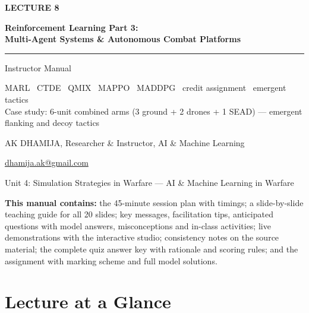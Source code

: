 \documentclass[11pt]{article}
\begin{document}
\begin{titlepage}\centering\vspace*{2.2cm}
{\color{AccN}\large\bfseries LECTURE 8\par}\vspace{0.6cm}
{\color{NavyN}\Huge\bfseries Reinforcement Learning Part 3:\\Multi-Agent Systems \& Autonomous Combat Platforms\par}\vspace{0.6cm}
{\color{AccN}\rule{0.7\textwidth}{1.5pt}}\par\vspace{0.6cm}
{\LARGE Instructor Manual\par}\vspace{0.4cm}
{\large\begin{minipage}{0.85\textwidth}\centering MARL \textbullet\ CTDE \textbullet\ QMIX \textbullet\ MAPPO \textbullet\ MADDPG \textbullet\ credit assignment \textbullet\ emergent tactics\\Case study: 6-unit combined arms (3 ground + 2 drones + 1 SEAD) --- emergent flanking and decoy tactics\end{minipage}\par}\vspace{2cm}
{\large AK DHAMIJA, Researcher \& Instructor, AI \& Machine Learning\par}\vspace{0.2cm}
{\normalsize \href{mailto:dhamija.ak@gmail.com}{dhamija.ak@gmail.com} \quad\textbullet{}\par}\vspace{0.3cm}
{Unit 4: Simulation Strategies in Warfare --- AI \& Machine Learning in Warfare\par}\vfill
\begin{tcolorbox}[colback=NavyN!4,colframe=NavyN,boxrule=0.6pt,arc=2pt,width=0.9\textwidth]\small
\textbf{This manual contains:} the 45-minute session plan with timings; a slide-by-slide teaching guide for all 20 slides; key messages, facilitation tips, anticipated questions with model answers, misconceptions and in-class activities; live demonstrations with the interactive studio; consistency notes on the source material; the complete quiz answer key with rationale and scoring rules; and the assignment with marking scheme and full model solutions.
\end{tcolorbox}
\end{titlepage}
\tableofcontents\newpage


\section{Lecture at a Glance}
\end{document}
